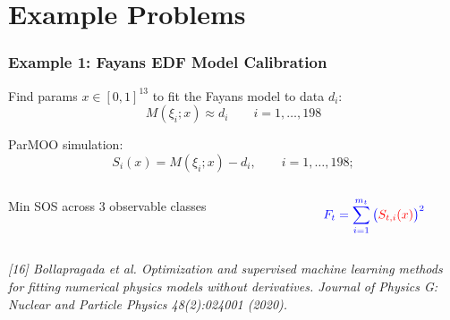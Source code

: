 \documentclass[aspectratio=169]{beamer}
\begin{document}
\section{Example Problems}

\begin{frame}\frametitle{Example 1: Fayans EDF Model Calibration}
Find params $x \in [0, 1]^{13}$ to fit the Fayans model to data $d_i$:
$$
M\left(\xi_{i};x\right) \approx d_{i} \qquad i=1,\ldots, 198
$$

\medskip

ParMOO simulation:
$$
S_{i}(x) = M\left(\xi_{i};x\right) - d_{i},
\qquad i=1,\ldots, 198;
$$

\medskip

\begin{columns}
\begin{column}{0.65\textwidth}
Min SOS across 3 observable classes
\end{column}
\begin{column}{0.35\textwidth}
$$
{\color{blue}F_t = \sum_{i=1}^{m_t}\big({\color{red}S_{t,i}(x)}\big)^2}
$$
\end{column}
\end{columns}

\vfill

{\tiny\it
[16] Bollapragada et al.
Optimization and supervised machine learning methods for fitting numerical physics models without derivatives.
Journal of Physics G: Nuclear and Particle Physics 48(2):024001 (2020).\\}
\end{frame}
\end{document}
